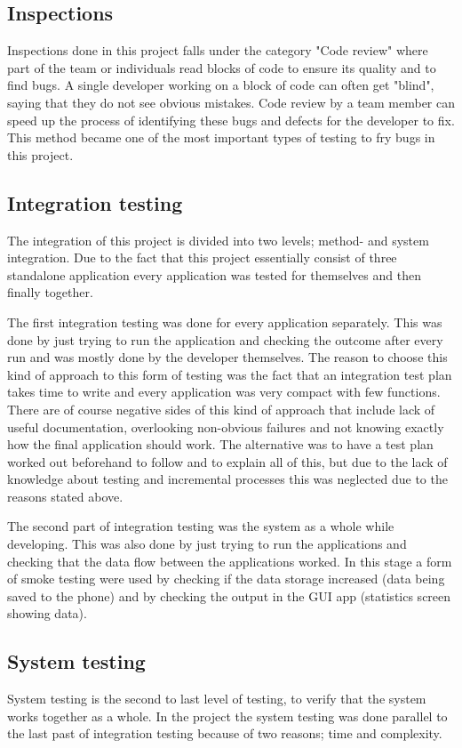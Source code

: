 \subsection{Inspections}
Inspections done in this project falls under the category "Code review" where part of the team or individuals read blocks of code to ensure its quality and to find bugs. A single developer working on a block of code can often get "blind", saying that they do not see obvious mistakes. Code review by a team member can speed up the process of identifying these bugs and defects for the developer to fix. This method became one of the most important types of testing to fry bugs in this project.
\subsection{Integration testing}
The integration of this project is divided into two levels; method- and system integration. Due to the fact that this project essentially consist of three standalone application every application was tested for themselves and then finally together.

The first integration testing was done for every application separately. This was done by just trying to run the application and checking the outcome after every run and was mostly done by the developer themselves. The reason to choose this kind of approach to this form of testing was the fact that an integration test plan takes time to write and every application was very compact with few functions. There are of course negative sides of this kind of approach that include lack of useful documentation, overlooking non-obvious failures and not knowing exactly how the final application should work. The alternative was to have a test plan worked out beforehand to follow and to explain all of this, but due to the lack of knowledge about testing and incremental processes this was neglected due to the reasons stated above.

The second part of integration testing was the system as a whole while developing. This was also done by just trying to run the applications and checking that the data flow between the applications worked. In this stage a form of smoke testing were used by checking if the data storage increased (data being saved to the phone) and by checking the output in the GUI app (statistics screen showing data).
\subsection{System testing}
System testing is the second to last level of testing, to verify that the system works together as a whole. In the project the system testing was done parallel to the last past of integration testing because of two reasons; time and complexity.\\

